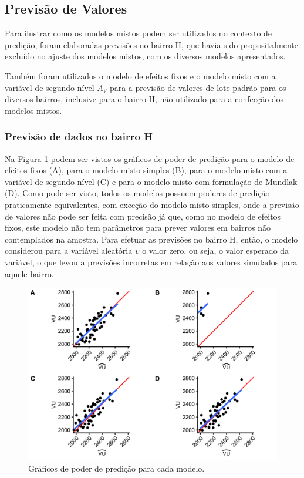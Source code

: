 \documentclass[
  a4paper, 12pt]{article}
\begin{document}
\hypertarget{previsuxe3o-de-valores}{%
\subsection{Previsão de Valores}\label{previsuxe3o-de-valores}}

Para ilustrar como os modelos mistos podem ser utilizados no contexto de
predição, foram elaboradas previsões no bairro H, que havia sido
propositalmente excluído no ajuste dos modelos mistos, com os diversos
modelos apresentados.

Também foram utilizados o modelo de efeitos fixos e o modelo misto com a
variável de segundo nível \(A_V\) para a previsão de valores de
lote-padrão para os diversos bairros, inclusive para o bairro H, não
utilizado para a confecção dos modelos mistos.

\hypertarget{previsuxe3o-de-dados-no-bairro-h}{%
\subsubsection{Previsão de dados no bairro
H}\label{previsuxe3o-de-dados-no-bairro-h}}

Na Figura \ref{fig:powerPlots} podem ser vistos os gráficos de poder de
predição para o modelo de efeitos fixos (A), para o modelo misto simples
(B), para o modelo misto com a variável de segundo nível (C) e para o
modelo misto com formulação de Mundlak (D). Como pode ser visto, todos
os modelos possuem poderes de predição praticamente equivalentes, com
exceção do modelo misto simples, onde a previsão de valores não pode ser
feita com precisão já que, como no modelo de efeitos fixos, este modelo
não tem parâmetros para prever valores em bairros não contemplados na
amostra. Para efetuar as previsões no bairro H, então, o modelo
considerou para a variável aleatória \(\upsilon\) o valor zero, ou seja,
o valor esperado da variável, o que levou a previsões incorretas em
relação aos valores simulados para aquele bairro.

\begin{figure}[H]

{\centering \includegraphics[width=1\linewidth]{images/powerPlots-1} 

}

\caption{Gráficos de poder de predição para cada modelo.}\label{fig:powerPlots}
\end{figure}
\end{document}
